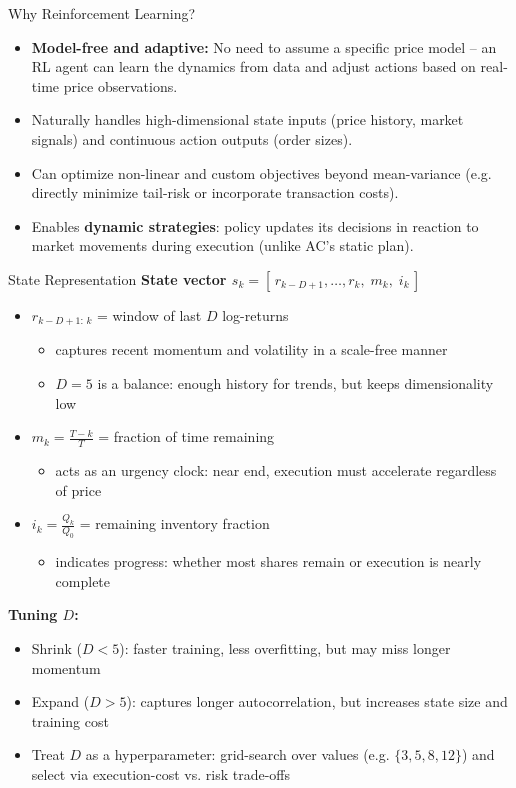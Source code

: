 \documentclass[11pt,aspectratio=169]{beamer}   %
\begin{document}
\begin{frame}{Why Reinforcement Learning?}
	\begin{itemize}
		\item \textbf{Model-free and adaptive:} No need to assume a specific price model – an RL agent can learn the dynamics from data and adjust actions based on real-time price observations.
		\item Naturally handles high-dimensional state inputs (price history, market signals) and continuous action outputs (order sizes).
		\item Can optimize non-linear and custom objectives beyond mean-variance (e.g. directly minimize tail-risk or incorporate transaction costs).
		\item Enables \textbf{dynamic strategies}: policy updates its decisions in reaction to market movements during execution (unlike AC’s static plan).
	\end{itemize}
\end{frame}

\begin{frame}{State Representation}
	\textbf{State vector $s_k = [\,r_{k-D+1}, \dots, r_{k},\; m_k,\; i_k\,]$}
	\begin{itemize}
		\item $r_{k-D+1:\,k}$ = window of last $D$ log-returns
		\begin{itemize}
			\item captures recent momentum and volatility in a scale-free manner
			\item $D=5$ is a balance: enough history for trends, but keeps dimensionality low
		\end{itemize}
		\item $m_k = \frac{T-k}{T}$ = fraction of time remaining
		\begin{itemize}
			\item acts as an urgency clock: near end, execution must accelerate regardless of price
		\end{itemize}
		\item $i_k = \frac{Q_k}{Q_0}$ = remaining inventory fraction
		\begin{itemize}
			\item indicates progress: whether most shares remain or execution is nearly complete
		\end{itemize}
	\end{itemize}
	
	\vspace{1em}
	\textbf{Tuning $D$:}
	\begin{itemize}
		\item Shrink ($D\!<5$): faster training, less overfitting, but may miss longer momentum
		\item Expand ($D\!>5$): captures longer autocorrelation, but increases state size and training cost
		\item Treat $D$ as a hyperparameter: grid-search over values (e.g. $\{3,5,8,12\}$) and select via execution-cost vs. risk trade-offs
	\end{itemize}
\end{frame}
\end{document}
